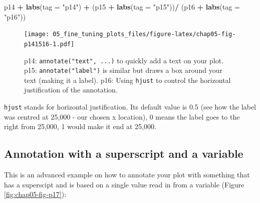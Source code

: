 \documentclass[
  12pt,
  krantz2]{krantz}
\makeatletter
\newenvironment{Shaded}{\begin{snugshade}}{\end{snugshade}}
\newcommand{\DataTypeTok}[1]{\textcolor[rgb]{0.13,0.29,0.53}{#1}}
\newcommand{\KeywordTok}[1]{\textcolor[rgb]{0.13,0.29,0.53}{\textbf{#1}}}
\newcommand{\NormalTok}[1]{#1}
\newcommand{\OperatorTok}[1]{\textcolor[rgb]{0.81,0.36,0.00}{\textbf{#1}}}
\newcommand{\StringTok}[1]{\textcolor[rgb]{0.31,0.60,0.02}{#1}}
\newenvironment{kframe}{%
\medskip{}
\setlength{\fboxsep}{.8em}
 \def\at@end@of@kframe{}%
 \ifinner\ifhmode%
  \def\at@end@of@kframe{\end{minipage}}%
  \begin{minipage}{\columnwidth}%
 \fi\fi%
 \def\FrameCommand##1{\hskip\@totalleftmargin \hskip-\fboxsep
 \colorbox{shadecolor}{##1}\hskip-\fboxsep
     \hskip-\linewidth \hskip-\@totalleftmargin \hskip\columnwidth}%
 \MakeFramed {\advance\hsize-\width
   \@totalleftmargin\z@ \linewidth\hsize
   \@setminipage}}%
 {\par\unskip\endMakeFramed%
 \at@end@of@kframe}
\renewenvironment{Shaded}{\begin{kframe}}{\end{kframe}}
\makeatother
\begin{document}
\begin{Shaded}
\begin{Highlighting}[]
\NormalTok{p14 }\OperatorTok{+}\StringTok{ }\KeywordTok{labs}\NormalTok{(}\DataTypeTok{tag =} \StringTok{"p14"}\NormalTok{) }\OperatorTok{+}\StringTok{ }\NormalTok{(p15 }\OperatorTok{+}\StringTok{ }\KeywordTok{labs}\NormalTok{(}\DataTypeTok{tag =} \StringTok{"p15"}\NormalTok{))}\OperatorTok{/}\StringTok{ }\NormalTok{(p16 }\OperatorTok{+}\StringTok{ }\KeywordTok{labs}\NormalTok{(}\DataTypeTok{tag =} \StringTok{"p16"}\NormalTok{))}
\end{Highlighting}
\end{Shaded}

\begin{figure}
\centering
\texttt{[image: 05\_fine\_tuning\_plots\_files/figure-latex/chap05-fig-p141516-1.pdf]}
\caption{\label{fig:chap05-fig-p141516}p14: \texttt{annotate("text",\ ...)} to quickly add a text on your plot. p15: \texttt{annotate("label")} is similar but draws a box around your text (making it a label). p16: Using \texttt{hjust} to control the horizontal justification of the annotation.}
\end{figure}

\texttt{hjust} stands for horizontal justification. Its default value is 0.5 (see how the label was centred at 25,000 - our chosen x location), 0 means the label goes to the right from 25,000, 1 would make it end at 25,000.

\hypertarget{annotation-with-a-superscript-and-a-variable}{%
\subsection{Annotation with a superscript and a variable}\label{annotation-with-a-superscript-and-a-variable}}


This is an advanced example on how to annotate your plot with something that has a superscipt and is based on a single value read in from a variable (Figure \ref{fig:chap05-fig-p17}):
\end{document}
